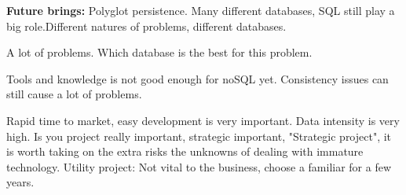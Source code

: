 {\textbf{Future brings:}
Polyglot persistence. Many different databases, SQL still play a big role.Different natures of problems, different databases.

A lot of problems. Which database is the best for this problem. 

Tools and knowledge is not good enough for noSQL yet. Consistency issues can still cause a lot of problems.

Rapid time to market, easy development is very important. Data intensity is very high. Is you project really important, strategic important, "Strategic project", it is worth taking on the extra risks the unknowns of dealing with immature technology. Utility project: Not vital to the business, choose a familiar for a few years.

}


